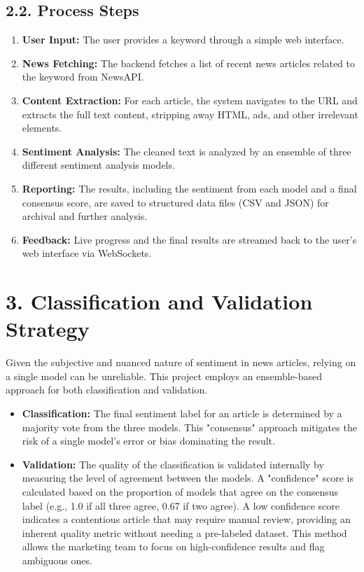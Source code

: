 \documentclass[11pt,a4paper]{article}
\begin{document}
\subsection*{2.2. Process Steps}
\begin{enumerate}
    \item \textbf{User Input:} The user provides a keyword through a simple web interface.
    \item \textbf{News Fetching:} The backend fetches a list of recent news articles related to the keyword from NewsAPI.
    \item \textbf{Content Extraction:} For each article, the system navigates to the URL and extracts the full text content, stripping away HTML, ads, and other irrelevant elements.
    \item \textbf{Sentiment Analysis:} The cleaned text is analyzed by an ensemble of three different sentiment analysis models.
    \item \textbf{Reporting:} The results, including the sentiment from each model and a final consensus score, are saved to structured data files (CSV and JSON) for archival and further analysis.
    \item \textbf{Feedback:} Live progress and the final results are streamed back to the user's web interface via WebSockets.
\end{enumerate}

\section*{3. Classification and Validation Strategy}
Given the subjective and nuanced nature of sentiment in news articles, relying on a single model can be unreliable. This project employs an ensemble-based approach for both classification and validation.

\begin{itemize}
    \item \textbf{Classification:} The final sentiment label for an article is determined by a majority vote from the three models. This "consensus" approach mitigates the risk of a single model's error or bias dominating the result.
    \item \textbf{Validation:} The quality of the classification is validated internally by measuring the level of agreement between the models. A "confidence" score is calculated based on the proportion of models that agree on the consensus label (e.g., 1.0 if all three agree, 0.67 if two agree). A low confidence score indicates a contentious article that may require manual review, providing an inherent quality metric without needing a pre-labeled dataset. This method allows the marketing team to focus on high-confidence results and flag ambiguous ones.
\end{itemize}
\end{document}
